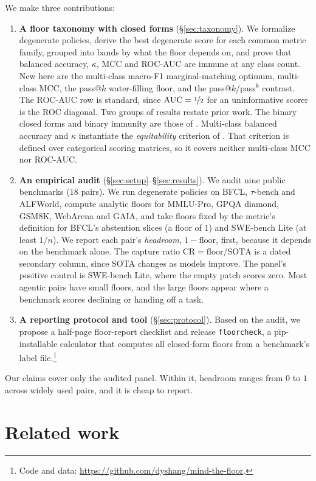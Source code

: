 \documentclass{article}
\theoremstyle{plain}
\theoremstyle{definition}
\newcommand{\floorcheck}{\texttt{floorcheck}}
\newcommand{\CR}{\mathrm{CR}}
\begin{document}
We make three contributions:
\begin{enumerate}
  \item \textbf{A floor taxonomy with closed forms} (\S\ref{sec:taxonomy}). We formalize degenerate policies, derive the best degenerate score for each common metric family, grouped into bands by what the floor depends on, and prove that balanced accuracy, $\kappa$, MCC and ROC-AUC are immune at any class count. New here are the multi-class macro-F1 marginal-matching optimum, multi-class MCC, the pass@$k$ water-filling floor, and the pass@$k$/pass$^{k}$ contrast. The ROC-AUC row is standard, since $\mathrm{AUC} = \nicefrac{1}{2}$ for an uninformative scorer is the ROC diagonal. Two groups of results restate prior work. The binary closed forms and binary immunity are those of \citet{vandebijl2022dutchdraw}. Multi-class balanced accuracy and $\kappa$ instantiate the \emph{equitability} criterion of \citet{gandin1992equitable}. That criterion is defined over categorical scoring matrices, so it covers neither multi-class MCC nor ROC-AUC.
  \item \textbf{An empirical audit} (\S\ref{sec:setup}--\S\ref{sec:results}). We audit nine public benchmarks ($18$ pairs). We run degenerate policies on BFCL, $\tau$-bench and ALFWorld, compute analytic floors for MMLU-Pro, GPQA diamond, GSM8K, WebArena and GAIA, and take floors fixed by the metric's definition for BFCL's abstention slices (a floor of $1$) and SWE-bench Lite (at least $1/n$). We report each pair's \emph{headroom}, $1 - \mathrm{floor}$, first, because it depends on the benchmark alone. The capture ratio $\CR = \text{floor}/\text{SOTA}$ is a dated secondary column, since SOTA changes as models improve. The panel's positive control is SWE-bench Lite, where the empty patch scores zero. Most agentic pairs have small floors, and the large floors appear where a benchmark scores declining or handing off a task.
  \item \textbf{A reporting protocol and tool} (\S\ref{sec:protocol}). Based on the audit, we propose a half-page floor-report checklist and release \floorcheck{}, a pip-installable calculator that computes all closed-form floors from a benchmark's label file.\footnote{Code and data: \url{https://github.com/dyshang/mind-the-floor}.}
\end{enumerate}

Our claims cover only the audited panel. Within it, headroom ranges from $0$ to $1$ across widely used pairs, and it is cheap to report.

\section{Related work}
\label{sec:related}
\end{document}
